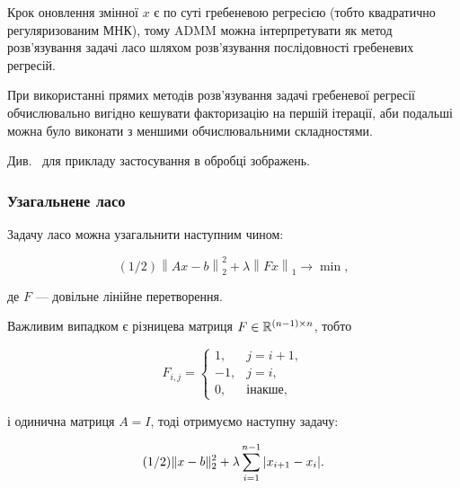 \begin{remark}
    Крок оновлення змінної $x$ є по суті гребеневою регресією (тобто квадратично регуляризованим МНК), тому ADMM можна інтерпретувати як метод розв'язування задачі ласо шляхом розв'язування послідовності гребеневих регресій.
\end{remark}

\begin{remark}
    При використанні прямих методів роз\-в'яз\-у\-ван\-ня задачі гребеневої регресії обчислювально вигідно кешувати факторизацію на першій ітерації, аби подальші можна було виконати з меншими обчислювальними складностями.
\end{remark}

\begin{remark}
    Див.~\cite{1} для прикладу застосування в обробці зображень.
\end{remark}

\subsubsection{Узагальнене ласо}

Задачу ласо можна узагальнити наступним чином:

\begin{equation}
    (1/2) \left\|A x - b\right\|_2^2 + \lambda \left\| F x \right\|_1 \to \min,
\end{equation}

де $F$ --- довільне лінійне перетворення. \medskip

\begin{example}
    Важливим випадком є різницева матриця $F \in \mathbb{R}^{(n - 1) \times n}$, тобто

    \begin{equation}
        F_{i,j} = \begin{cases}
            1, & j = i + 1, \\
            -1, & j = i, \\
            0, & \text{інакше},
        \end{cases}
    \end{equation}

    і одинична матриця $A = I$, тоді отримуємо наступну задачу:

    \begin{equation}
        (1 / 2) \| x - b \|_2^2 + \lambda \operatorname*{\sum}_{i = 1}^{n - 1} |x_{i + 1} - x_i|.
    \end{equation}
\end{example}


